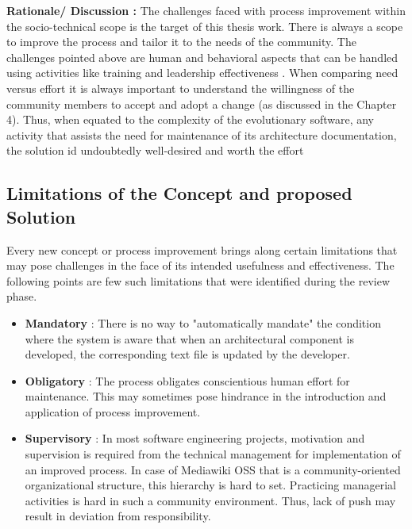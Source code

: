 \textbf{Rationale/ Discussion : } The challenges faced with process improvement within the socio-technical scope is the target of this thesis work. There is always a scope to improve the process and tailor it to the needs of the community. The challenges pointed above are human and behavioral aspects that can be handled using activities like training and leadership effectiveness \cite{Viana2012}.
\newline \newline When comparing need versus effort it is always important to understand the willingness of the community members to accept and adopt a change (as discussed in the Chapter 4). Thus, when equated to the complexity of the evolutionary software, any activity that assists the need for maintenance of its architecture documentation, the solution id undoubtedly well-desired and worth the effort

\subsection{Limitations of the Concept and proposed Solution}
Every new concept or process improvement brings along certain limitations that may pose challenges in the face of its intended usefulness and effectiveness. The following points are few such limitations that were identified during the review phase.
\begin{itemize}
\item \textbf{Mandatory} : There is no way to "automatically mandate" the condition where the system is aware that when an architectural component is developed, the corresponding text file is updated by the developer.
\item \textbf{Obligatory} : The process obligates conscientious human effort for maintenance. This may sometimes pose hindrance in the introduction and application of process improvement.
\item \textbf{Supervisory} : In most software engineering projects, motivation and supervision is required from the technical management for implementation of an improved process. In case of Mediawiki OSS that is a community-oriented organizational structure, this hierarchy is hard to set. Practicing managerial activities is hard in such a community environment. Thus, lack of push may result in deviation from responsibility.
\end{itemize}



